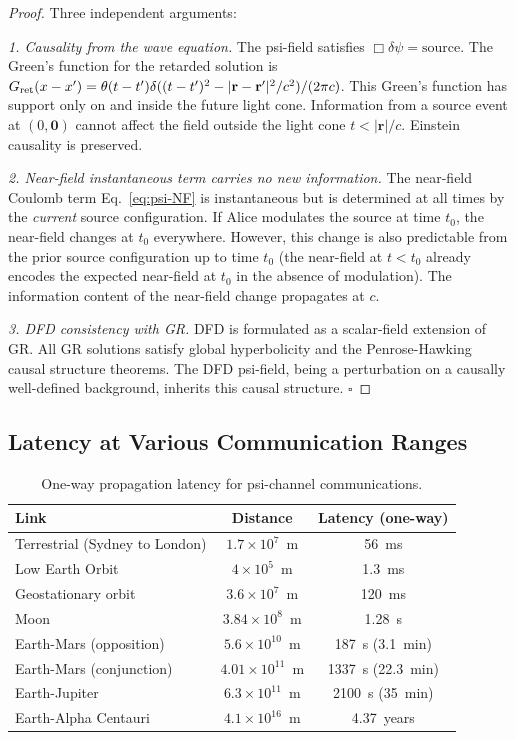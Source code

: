 \documentclass[aps,prd,twocolumn,superscriptaddress,nofootinbib]{revtex4-2}
\begin{document}
\begin{proof}
Three independent arguments:

\emph{1. Causality from the wave equation.} The psi-field satisfies
$\Box\delta\psi = \text{source}$. The Green's function for the retarded
solution is $G_{\rm ret}(x-x') = \theta(t-t')\delta((t-t')^2 - |\mathbf{r}-\mathbf{r}'|^2/c^2)/(2\pi c)$.
This Green's function has support only on and inside the future light cone.
Information from a source event at $(0,\mathbf{0})$ cannot affect the field
outside the light cone $t < |\mathbf{r}|/c$. Einstein causality is preserved.

\emph{2. Near-field instantaneous term carries no new information.}
The near-field Coulomb term Eq.~\eqref{eq:psi-NF} is instantaneous but
is determined at all times by the \emph{current} source configuration.
If Alice modulates the source at time $t_0$, the near-field changes at
$t_0$ everywhere. However, this change is also predictable from the prior
source configuration up to time $t_0$ (the near-field at $t<t_0$ already
encodes the expected near-field at $t_0$ in the absence of modulation).
The information content of the near-field change propagates at $c$.

\emph{3. DFD consistency with GR.}
DFD is formulated as a scalar-field extension of GR. All GR solutions satisfy
global hyperbolicity and the Penrose-Hawking causal structure theorems.
The DFD psi-field, being a perturbation on a causally well-defined background,
inherits this causal structure. $\square$
\end{proof}

\subsection{Latency at Various Communication Ranges}

\begin{table}[h]
\centering
\caption{One-way propagation latency for psi-channel communications.}
\begin{tabular}{lcc}
\hline\hline
Link & Distance & Latency (one-way) \\
\hline
Terrestrial (Sydney to London) & $1.7\times10^7$~m & 56~ms \\
Low Earth Orbit & $4\times10^5$~m & 1.3~ms \\
Geostationary orbit & $3.6\times10^7$~m & 120~ms \\
Moon & $3.84\times10^8$~m & 1.28~s \\
Earth-Mars (opposition) & $5.6\times10^{10}$~m & 187~s (3.1~min) \\
Earth-Mars (conjunction) & $4.01\times10^{11}$~m & 1337~s (22.3~min) \\
Earth-Jupiter & $6.3\times10^{11}$~m & 2100~s (35~min) \\
Earth-Alpha Centauri & $4.1\times10^{16}$~m & 4.37~years \\
\hline\hline
\end{tabular}
\label{tab:latency}
\end{table}
\end{document}
